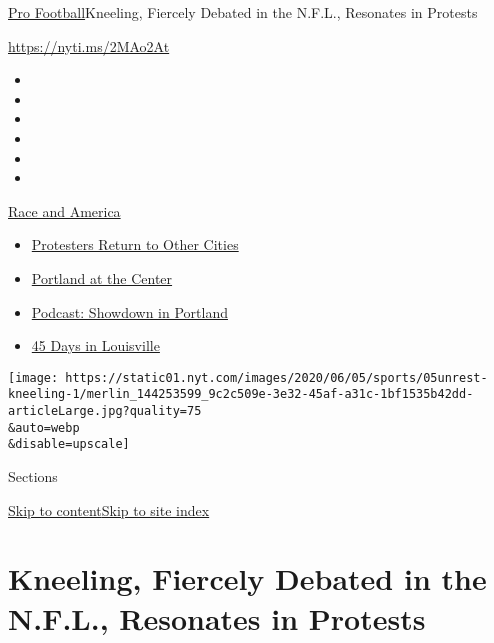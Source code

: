 \href{/section/sports/football}{Pro Football}\textbar{}Kneeling,
Fiercely Debated in the N.F.L., Resonates in Protests

\url{https://nyti.ms/2MAo2At}

\begin{itemize}
\item
\item
\item
\item
\item
\item
\end{itemize}

\href{https://www.nytimes.com/news-event/george-floyd-protests-minneapolis-new-york-los-angeles?action=click\&pgtype=Article\&state=default\&region=TOP_BANNER\&context=storylines_menu}{Race
and America}

\begin{itemize}
\tightlist
\item
  \href{https://www.nytimes.com/2020/07/26/us/protests-portland-seattle-trump.html?action=click\&pgtype=Article\&state=default\&region=TOP_BANNER\&context=storylines_menu}{Protesters
  Return to Other Cities}
\item
  \href{https://www.nytimes.com/2020/07/24/us/portland-oregon-protests-white-race.html?action=click\&pgtype=Article\&state=default\&region=TOP_BANNER\&context=storylines_menu}{Portland
  at the Center}
\item
  \href{https://www.nytimes.com/2020/07/23/podcasts/the-daily/portland-protests.html?action=click\&pgtype=Article\&state=default\&region=TOP_BANNER\&context=storylines_menu}{Podcast:
  Showdown in Portland}
\item
  \href{https://www.nytimes.com/interactive/2020/07/16/us/black-lives-matter-protests-louisville-breonna-taylor.html?action=click\&pgtype=Article\&state=default\&region=TOP_BANNER\&context=storylines_menu}{45
  Days in Louisville}
\end{itemize}

\texttt{[image: https://static01.nyt.com/images/2020/06/05/sports/05unrest-kneeling-1/merlin\_144253599\_9c2c509e-3e32-45af-a31c-1bf1535b42dd-articleLarge.jpg?quality=75\\\&auto=webp\\\&disable=upscale]}

Sections

\protect\hyperlink{site-content}{Skip to
content}\protect\hyperlink{site-index}{Skip to site index}

\hypertarget{kneeling-fiercely-debated-in-the-nfl-resonates-in-protests}{%
\section{Kneeling, Fiercely Debated in the N.F.L., Resonates in
Protests}\label{kneeling-fiercely-debated-in-the-nfl-resonates-in-protests}}

